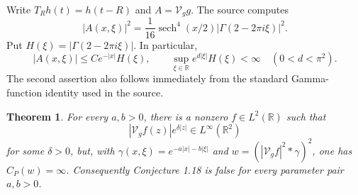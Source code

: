 \documentclass[11pt]{article}
\newtheorem{theorem}{Theorem}
\newcommand{\R}{\mathbb R}
\newcommand{\V}{\mathcal V}
\newcommand{\sech}{\operatorname{sech}}
\begin{document}
Write \(T_Rh(t)=h(t-R)\) and \(A=\V_gg\).  The source computes
\begin{equation}\label{eq:Aexact}
 |A(x,\xi)|^2=\frac1{16}\sech^4(x/2)
 |\Gamma(2-2\pi i\xi)|^2.
\end{equation}
Put \(H(\xi)=|\Gamma(2-2\pi i\xi)|\).  In particular,
\begin{equation}\label{eq:Abound}
 |A(x,\xi)|\le C e^{-|x|}H(\xi),
 \qquad
 \sup_{\xi\in\R}e^{d|\xi|}H(\xi)<\infty\quad(0<d<\pi^2).
\end{equation}
The second assertion also follows immediately from the standard Gamma-function
identity used in the source.

\begin{theorem}\label{thm:counterexample}
For every \(a,b>0\), there is a nonzero \(f\in L^2(\R)\) such that
\[
 |\V_gf(z)|e^{\delta|z|}\in L^\infty(\R^2)
\]
for some \(\delta>0\), but, with
\(\gamma(x,\xi)=e^{-a|x|-b|\xi|}\) and
\(w=(|\V_gf|^2*\gamma)^2\), one has \(C_P(w)=\infty\).
Consequently Conjecture 1.18 is false for every parameter pair \(a,b>0\).
\end{theorem}
\end{document}
